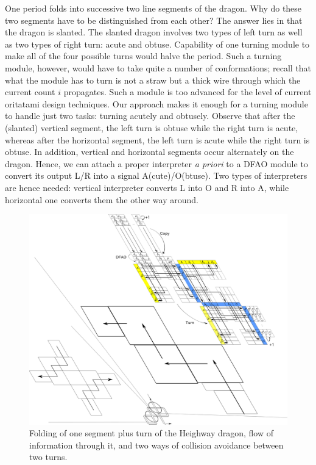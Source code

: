One period folds into successive two line segments of the dragon. 
Why do these two segments have to be distinguished from each other? 
The answer lies in that the dragon is slanted. 
The slanted dragon involves two types of left turn as well as two types of right turn: acute and obtuse. 
Capability of one turning module to make all of the four possible turns would halve the period. 
Such a turning module, however, would have to take quite a number of conformations; recall that what the module has to turn is not a straw but a thick wire through which the current count $i$ propagates. 
Such a module is too advanced for the level of current oritatami design techniques.  
Our approach makes it enough for a turning module to handle just two tasks: turning acutely and obtusely. 
Observe that after the (slanted) vertical segment, the left turn is obtuse while the right turn is acute, whereas after the horizontal segment, the left turn is acute while the right turn is obtuse. 
In addition, vertical and horizontal segments occur alternately on the dragon. 
Hence, we can attach a proper interpreter \textit{a priori} to a DFAO module to convert its output L/R into a signal A(cute)/O(btuse). 
Two types of interpreters are hence needed: vertical interpreter converts L into O and R into A, while horizontal one converts them the other way around. 

\begin{figure}[tb]
\includegraphics[width=\linewidth]{pic/dragon_vol4.pdf}
\caption{
Folding of one segment plus turn of the Heighway dragon, flow of information through it, and two ways of collision avoidance between two turns.
}
\label{fig:abst_dragon}
\end{figure}

